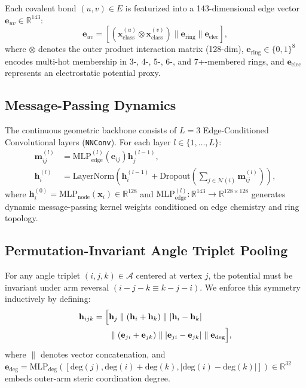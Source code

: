 \documentclass[10pt,journal,compsoc]{IEEEtran}
\begin{document}
Each covalent bond $(u, v) \in E$ is featurized into a 143-dimensional edge vector $\mathbf{e}_{uv} \in \mathbb{R}^{143}$:
\begin{equation}
\mathbf{e}_{uv} = \left[ (\mathbf{x}_{\text{class}}^{(u)} \otimes \mathbf{x}_{\text{class}}^{(v)}) \parallel \mathbf{e}_{\text{ring}} \parallel \mathbf{e}_{\text{elec}} \right],
\end{equation}
where $\otimes$ denotes the outer product interaction matrix (128-dim), $\mathbf{e}_{\text{ring}} \in \{0, 1\}^8$ encodes multi-hot membership in 3-, 4-, 5-, 6-, and 7+-membered rings, and $\mathbf{e}_{\text{elec}}$ represents an electrostatic potential proxy.

\subsection{Message-Passing Dynamics}
The continuous geometric backbone consists of $L = 3$ Edge-Conditioned Convolutional layers (\texttt{NNConv}). For each layer $l \in \{1, \dots, L\}$:
\begin{align}
\mathbf{m}_{ij}^{(l)} &= \text{MLP}_{\text{edge}}^{(l)}(\mathbf{e}_{ij}) \mathbf{h}_j^{(l-1)}, \label{eq:msg}\\
\mathbf{h}_i^{(l)} &= \text{LayerNorm}\left( \mathbf{h}_i^{(l-1)} + \text{Dropout}\left(\sum_{j \in \mathcal{N}(i)} \mathbf{m}_{ij}^{(l)}\right) \right), \label{eq:update}
\end{align}
where $\mathbf{h}_i^{(0)} = \text{MLP}_{\text{node}}(\mathbf{x}_i) \in \mathbb{R}^{128}$ and $\text{MLP}_{\text{edge}}^{(l)}: \mathbb{R}^{143} \to \mathbb{R}^{128 \times 128}$ generates dynamic message-passing kernel weights conditioned on edge chemistry and ring topology.

\subsection{Permutation-Invariant Angle Triplet Pooling}
For any angle triplet $(i, j, k) \in \mathcal{A}$ centered at vertex $j$, the potential must be invariant under arm reversal $(i-j-k \equiv k-j-i)$. We enforce this symmetry inductively by defining:
\begin{align}
\mathbf{h}_{ijk} = \Big[ &\mathbf{h}_j \parallel (\mathbf{h}_i + \mathbf{h}_k) \parallel |\mathbf{h}_i - \mathbf{h}_k| \notag \\
&\parallel (\mathbf{e}_{ji} + \mathbf{e}_{jk}) \parallel |\mathbf{e}_{ji} - \mathbf{e}_{jk}| \parallel \mathbf{e}_{\text{deg}} \Big],
\label{eq:triplet}
\end{align}
where $\parallel$ denotes vector concatenation, and $\mathbf{e}_{\text{deg}} = \text{MLP}_{\text{deg}}([\text{deg}(j), \text{deg}(i)+\text{deg}(k), |\text{deg}(i)-\text{deg}(k)|]) \in \mathbb{R}^{32}$ embeds outer-arm steric coordination degree.
\end{document}
